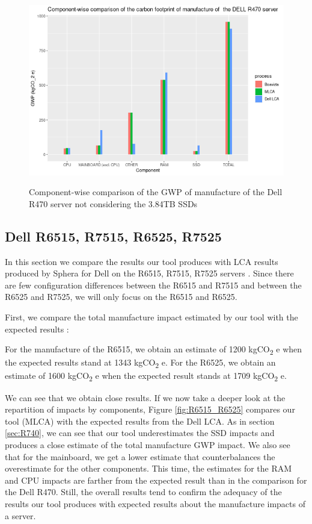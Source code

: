 \documentclass[11pt]{article}
\begin{document}
\begin{figure}[t]
  \centering
  \includegraphics[width=.95\linewidth,page=1]{./figures/R470_no_SSD.png}                                                                                                                               
  \label{fig:R740}
  \caption{Component-wise comparison of the GWP of manufacture of the Dell R470 server not considering the 3.84TB SSDs}
\end{figure}


\subsection{Dell R6515, R7515, R6525, R7525}
\label{sec:orgf53f071}

In this section we compare the results our tool produces with
\gls{LCA} results produced by Sphera for Dell on the R6515, R7515, R7525
servers \cite{sphera2021lca}. Since there are few configuration differences
between the R6515 and R7515 and between the R6525 and R7525, we will
only focus on the R6515 and R6525.

First, we compare the total manufacture impact estimated by our tool
with the expected results : 

For the manufacture of the R6515, we obtain an estimate of 1200 kgCO\textsubscript{2}
e when the expected results stand at 1343 kgCO\textsubscript{2} e.
For the R6525, we obtain an estimate of 1600 kgCO\textsubscript{2} e when the expected
result stands at 1709 kgCO\textsubscript{2} e.

We can see that we obtain close results. If we now take a deeper look
at the repartition of impacts by components, Figure
\ref{fig:R6515_R6525} compares our tool (MLCA) with the expected
results from the Dell \gls{LCA}. As in section \ref{sec:R740}, we can
see that our tool underestimates the SSD impacts and produces a close
estimate of the total manufacture \gls{GWP} impact. We also see that
for the mainboard, we get a lower estimate that counterbalances the
overestimate for the other components. This time, the estimates for
the RAM and CPU impacts are farther from the expected result than in
the comparison for the Dell R470. Still, the overall results tend to
confirm the adequacy of the results our tool produces with expected
results about the manufacture impacts of a server.
\end{document}

